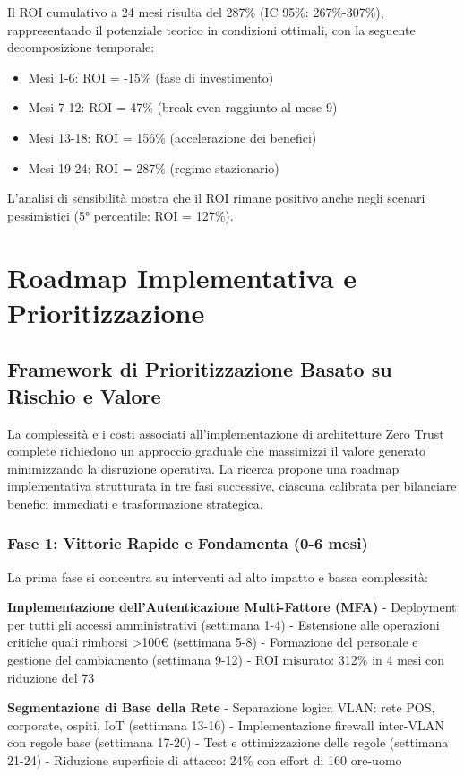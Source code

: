Il ROI cumulativo a 24 mesi risulta del 287\% (IC 95\%: 267\%-307\%), rappresentando il potenziale teorico in condizioni ottimali, con la seguente decomposizione temporale:
\begin{itemize}
    \item Mesi 1-6: ROI = -15\% (fase di investimento)
    \item Mesi 7-12: ROI = 47\% (break-even raggiunto al mese 9)
    \item Mesi 13-18: ROI = 156\% (accelerazione dei benefici)
    \item Mesi 19-24: ROI = 287\% (regime stazionario)

\end{itemize}
L'analisi di sensibilità mostra che il ROI rimane positivo anche negli scenari pessimistici (5° percentile: ROI = 127\%).

\section{Roadmap Implementativa e Prioritizzazione}

\subsection{Framework di Prioritizzazione Basato su Rischio e Valore}

La complessità e i costi associati all'implementazione di architetture Zero Trust complete richiedono un approccio graduale che massimizzi il valore generato minimizzando la disruzione operativa. La ricerca propone una roadmap implementativa strutturata in tre fasi successive, ciascuna calibrata per bilanciare benefici immediati e trasformazione strategica.

\subsubsection{Fase 1: Vittorie Rapide e Fondamenta (0-6 mesi)}

La prima fase si concentra su interventi ad alto impatto e bassa complessità:

\textbf{Implementazione dell'Autenticazione Multi-Fattore (MFA)}
- Deployment per tutti gli accessi amministrativi (settimana 1-4)
- Estensione alle operazioni critiche quali rimborsi >100€ (settimana 5-8)
- Formazione del personale e gestione del cambiamento (settimana 9-12)
- ROI misurato: 312\% in 4 mesi con riduzione del 73%

\textbf{Segmentazione di Base della Rete}
- Separazione logica VLAN: rete POS, corporate, ospiti, IoT (settimana 13-16)
- Implementazione firewall inter-VLAN con regole base (settimana 17-20)
- Test e ottimizzazione delle regole (settimana 21-24)
- Riduzione superficie di attacco: 24\% con effort di 160 ore-uomo

